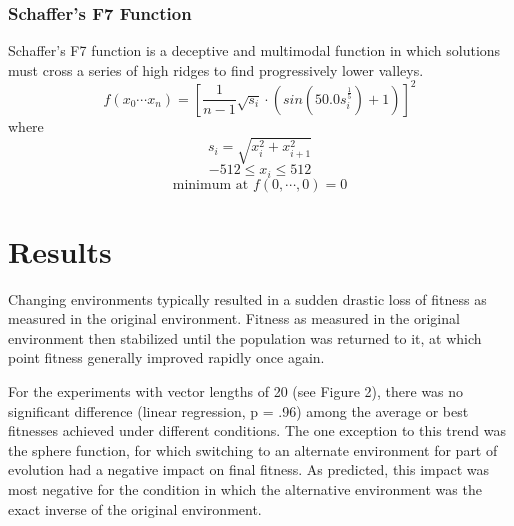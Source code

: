 \documentclass{sig-alternate}
\begin{document}
\subsubsection{Schaffer's F7 Function}
Schaffer's F7 function is a deceptive and multimodal function in which solutions must cross a series of high ridges to find progressively lower valleys.
\begin{displaymath}f(x_0 \cdots x_n) = [\frac{1}{n-1}\sqrt{s_i} \cdot (sin(50.0s_i^{\frac{1}{5}})+1)]^2 \end{displaymath}
where
\begin{displaymath}s_i = \sqrt{x_i^2 + x_{i+1}^2}\end{displaymath}
\begin{displaymath}-512 \leq x_i \leq 512\end{displaymath}
\begin{displaymath}\text{minimum at }f(0, \cdots, 0) = 0\end{displaymath}

\section{Results}

Changing environments typically resulted in a sudden drastic loss of fitness as measured in the original environment. Fitness as measured in the original environment then stabilized until the population was returned to it, at which point fitness generally improved rapidly once again.

For the experiments with vector lengths of 20 (see Figure 2), there was no significant difference (linear regression, p = .96) among the average or best fitnesses achieved under different conditions. The one exception to this trend was the sphere function, for which switching to an alternate environment for part of evolution had a negative impact on final fitness. As predicted, this impact was most negative for the condition in which the alternative environment was the exact inverse of the original environment. 
\end{document}

